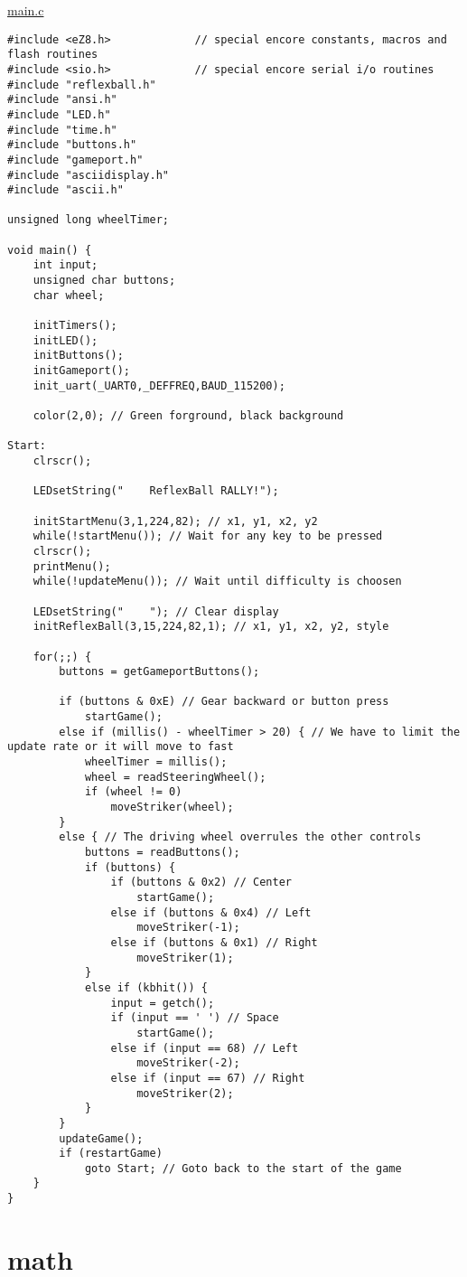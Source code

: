 \underline{main.c}
\begin{lstlisting}
#include <eZ8.h>             // special encore constants, macros and flash routines
#include <sio.h>             // special encore serial i/o routines
#include "reflexball.h"
#include "ansi.h"
#include "LED.h"
#include "time.h"
#include "buttons.h"
#include "gameport.h"
#include "asciidisplay.h"
#include "ascii.h"

unsigned long wheelTimer;

void main() {
	int input;
	unsigned char buttons;
	char wheel;

	initTimers();
	initLED();
	initButtons();
	initGameport();
	init_uart(_UART0,_DEFFREQ,BAUD_115200);

	color(2,0); // Green forground, black background

Start:
	clrscr();

	LEDsetString("    ReflexBall RALLY!");

	initStartMenu(3,1,224,82); // x1, y1, x2, y2
	while(!startMenu()); // Wait for any key to be pressed
	clrscr();
	printMenu();
	while(!updateMenu()); // Wait until difficulty is choosen

	LEDsetString("    "); // Clear display
	initReflexBall(3,15,224,82,1); // x1, y1, x2, y2, style

	for(;;) {
		buttons = getGameportButtons();		
		
		if (buttons & 0xE) // Gear backward or button press
			startGame();
		else if (millis() - wheelTimer > 20) { // We have to limit the update rate or it will move to fast
			wheelTimer = millis();
			wheel = readSteeringWheel();
			if (wheel != 0)
				moveStriker(wheel);
		}
		else { // The driving wheel overrules the other controls
			buttons = readButtons();
			if (buttons) {
				if (buttons & 0x2) // Center
					startGame();
				else if (buttons & 0x4) // Left
					moveStriker(-1);
				else if (buttons & 0x1) // Right
					moveStriker(1);
			}
			else if (kbhit()) {
				input = getch();
				if (input == ' ') // Space
					startGame();
				else if (input == 68) // Left
					moveStriker(-2);
				else if (input == 67) // Right
					moveStriker(2);
			}
		}
		updateGame();
		if (restartGame)
			goto Start; // Goto back to the start of the game
	}
}
\end{lstlisting}

\section{math}
\label{math}

